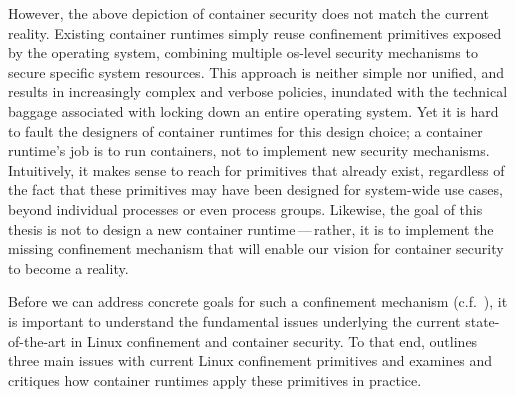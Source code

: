However, the above depiction of container security does not match the current reality.
Existing container runtimes simply reuse confinement primitives exposed by the operating
system, combining multiple \gls{os}-level security mechanisms to secure specific system
resources.  This approach is neither simple nor unified, and results in increasingly
complex and verbose policies, inundated with the technical baggage associated with locking
down an entire operating system. Yet it is hard to fault the designers of container
runtimes for this design choice; a container runtime's job is to run containers, not to
implement new security mechanisms. Intuitively, it makes sense to reach for primitives
that already exist, regardless of the fact that these primitives may have been designed
for system-wide use cases, beyond individual processes or even process groups. Likewise,
the goal of this thesis is not to design a new container runtime\,---\,rather, it is to
implement the missing confinement mechanism that will enable our vision for container
security to become a reality.

Before we can address concrete goals for such a confinement mechanism
(c.f.~), it is important to understand the fundamental
issues underlying the current state-of-the-art in Linux confinement and container
security. To that end,  outlines three main issues with current Linux
confinement primitives and  examines and critiques how container
runtimes apply these primitives in practice.




